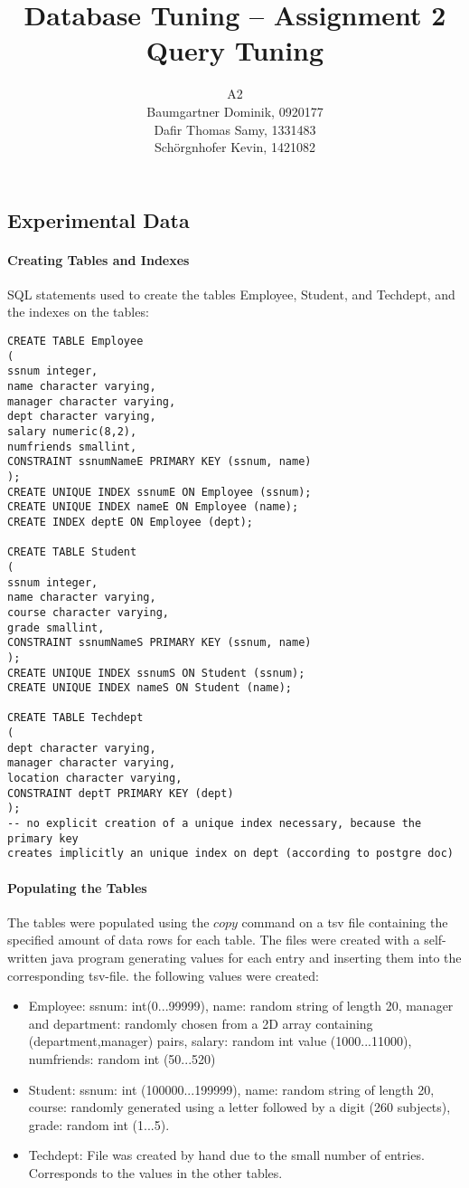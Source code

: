 \documentclass[11pt]{scrartcl}
\title{
  \textbf{\large Database Tuning -- Assignment 2}\\
  Query Tuning
}
\author{
 A2\\
\large Baumgartner Dominik, 0920177 \\
\large Dafir Thomas Samy, 1331483 \\
\large Sch\"orgnhofer Kevin, 1421082
}
\begin{document}
\maketitle

\subsection*{Experimental Data}

\paragraph{Creating Tables and Indexes}

SQL statements used to create the tables { Employee}, {
  Student}, and { Techdept}, and the indexes on the tables:

{\small
\begin{verbatim}
CREATE TABLE Employee 
(
ssnum integer,
name character varying,
manager character varying,
dept character varying,
salary numeric(8,2),
numfriends smallint,
CONSTRAINT ssnumNameE PRIMARY KEY (ssnum, name)
);
CREATE UNIQUE INDEX ssnumE ON Employee (ssnum);
CREATE UNIQUE INDEX nameE ON Employee (name);
CREATE INDEX deptE ON Employee (dept);

CREATE TABLE Student 
(
ssnum integer,
name character varying,
course character varying,
grade smallint,
CONSTRAINT ssnumNameS PRIMARY KEY (ssnum, name)
);
CREATE UNIQUE INDEX ssnumS ON Student (ssnum);
CREATE UNIQUE INDEX nameS ON Student (name);

CREATE TABLE Techdept
(
dept character varying,
manager character varying,
location character varying,
CONSTRAINT deptT PRIMARY KEY (dept)
);
-- no explicit creation of a unique index necessary, because the primary key
creates implicitly an unique index on dept (according to postgre doc)
\end{verbatim}
}

\paragraph{Populating the Tables}

	The tables were populated using the $copy$ command on a tsv file containing the specified amount of data rows for each table. The files were created with a self-written java program generating values for each entry and inserting them into the corresponding tsv-file.
	the following values were created:
	
	\begin{itemize}
		\item Employee: ssnum: int(0...99999), name: random string of length 20, manager and department: randomly chosen from a 2D array containing (department,manager) pairs, salary: random int value (1000...11000), numfriends: random int (50...520)
		\item Student:  ssnum: int (100000...199999), name: random string of length 20, course: randomly generated using a letter followed by a digit (260 subjects), grade: random int (1...5).
		\item Techdept: File was created by hand due to the small number of entries. Corresponds to the values in the other tables.
	\end{itemize}
\end{document}
